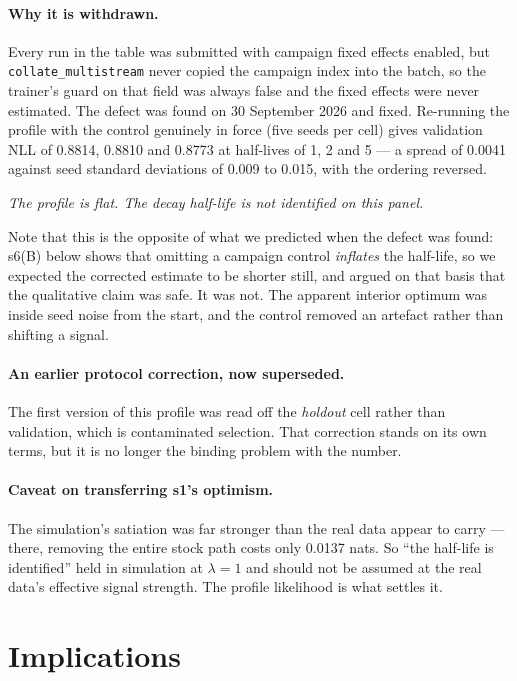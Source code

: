 \documentclass[11pt]{article}
\begin{document}
\paragraph{Why it is withdrawn.} Every run in the table was submitted with
campaign fixed effects enabled, but \texttt{collate\_multistream} never copied
the campaign index into the batch, so the trainer's guard on that field was
always false and the fixed effects were never estimated. The defect was found on
30 September 2026 and fixed. Re-running the profile with the control genuinely
in force (five seeds per cell) gives validation NLL of 0.8814, 0.8810 and 0.8773
at half-lives of 1, 2 and 5 --- a spread of 0.0041 against seed standard
deviations of 0.009 to 0.015, with the ordering reversed.

\begin{center}
\emph{The profile is flat. The decay half-life is not identified on this panel.}
\end{center}

\noindent Note that this is the opposite of what we predicted when the defect
was found: s6(B) below shows that omitting a campaign control \emph{inflates}
the half-life, so we expected the corrected estimate to be shorter still, and
argued on that basis that the qualitative claim was safe. It was not. The
apparent interior optimum was inside seed noise from the start, and the control
removed an artefact rather than shifting a signal.

\paragraph{An earlier protocol correction, now superseded.} The first version of
this profile was read off the \emph{holdout} cell rather than validation, which
is contaminated selection. That correction stands on its own terms, but it is no
longer the binding problem with the number.

\paragraph{Caveat on transferring s1's optimism.} The simulation's satiation was
far stronger than the real data appear to carry --- there, removing the entire
stock path costs only 0.0137 nats. So ``the half-life is identified'' held in
simulation at $\lambda=1$ and should not be assumed at the real data's effective
signal strength. The profile likelihood is what settles it.

\section{Implications}
\end{document}

